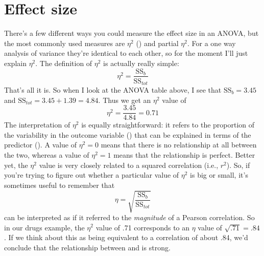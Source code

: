 \section{Effect size\label{sec:etasquared}}


There's a few different ways you could measure the effect size in an ANOVA, but the most commonly used measures are $\eta^2$ () and partial $\eta^2$. For a one way analysis of variance they're identical to each other, so for the moment I'll just explain $\eta^2$. The definition of $\eta^2$ is actually really simple:
$$
\eta^2 = \frac{\mbox{SS}_b}{\mbox{SS}_{tot}}
$$
That's all it is. So when I look at the ANOVA table above, I see that $\mbox{SS}_b = 3.45$  and $\mbox{SS}_{tot} = 3.45 + 1.39 = 4.84$. Thus we get an $\eta^2$ value of 
$$
\eta^2 = \frac{3.45}{4.84} = 0.71
$$
The interpretation of $\eta^2$ is equally straightforward: it refers to the proportion of the variability in the outcome variable () that can be explained in terms of the predictor (). A value of $\eta^2 = 0$ means that there is no relationship at all between the two, whereas a value of $\eta^2 = 1$ means that the relationship is perfect. Better yet, the $\eta^2$ value is very closely related to a squared correlation (i.e., $r^2$). So, if you're trying to figure out whether a particular value of $\eta^2$ is big or small, it's sometimes useful to remember that 
$$
\eta= \sqrt{\frac{\mbox{SS}_b}{\mbox{SS}_{tot}}}
$$
can be interpreted as if it referred to the {\it magnitude} of a Pearson correlation. So in our drugs example, the $\eta^2$ value of .71 corresponds to an $\eta$ value of $\sqrt{.71} = .84$. If we think about this as being equivalent to a correlation of about .84, we'd conclude that the relationship between  and  is strong. 

